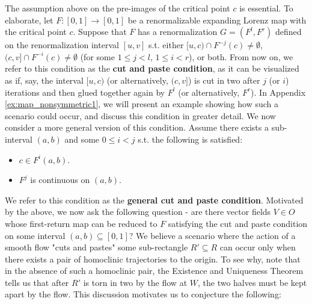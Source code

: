 \documentclass[10pt,reqno]{amsart}
\theoremstyle{plain}
\theoremstyle{assumption}
\theoremstyle{notation}
\theoremstyle{claim}
\theoremstyle{conj}
\theoremstyle{theorem}
\theoremstyle{proposition}
\theoremstyle{corollary}
\begin{document}
The assumption above on the pre-images of the critical point $c$ is essential. To elaborate, let $F:[0,1]\to[0,1]$ be a renormalizable expanding Lorenz map with the critical point $c$. Suppose that $F$ has a renormalization $G=(F^l,F^r)$ defined on the renormalization interval $[u,v]$ s.t. either $[u,c)\cap F^{-j}(c)\ne\emptyset$, $(c,v]\cap F^{-i}(c)\ne\emptyset$ (for some $1\leq j<l$, $1\leq i< r$), or both. From now on, we refer to this condition as the \textbf{cut and paste condition}, as it can be visualized as if, say, the interval $[u,c)$ (or alternatively, $(c,v]$) is cut in two after $j$ (or $i$) iterations and then glued together again by $F^l$ (or alternatively, $F^r$). In Appendix \ref{ex:map_nonsymmetric1}, we will present an example showing how such a scenario could occur, and discuss this condition in greater detail. We now consider a more general version of this condition. Assume there exists a sub-interval $(a,b)$ and some $0\leq i<j$ s.t. the following is satisfied:
    \begin{itemize}
        \item $c\in F^i(a,b)$.
        \item $F^j$ is continuous on $(a,b)$.
    \end{itemize}
We refer to this condition as the \textbf{general cut and paste condition}. Motivated by the above, we now ask the following question - are there vector fields $V\in O$ whose first-return map can be reduced to $F$ satisfying the cut and paste condition on some interval $(a,b)\subseteq[0,1]$? We believe a scenario where the action of a smooth flow "cuts and pastes" some sub-rectangle $R'\subseteq R$ can occur only when there exists a pair of homoclinic trajectories to the origin. To see why, note that in the absence of such a homoclinic pair, the Existence and Uniqueness Theorem tells us that after $R'$ is torn in two by the flow at $W$, the two halves must be kept apart by the flow. This discussion motivates us to conjecture the following:
\end{document}
